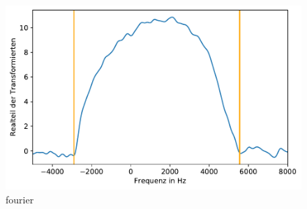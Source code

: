 \begin{figure}
    \center
    \includegraphics[scale = 1]{plots/fourier.pdf}
    \caption{fourier}
    \label{fig:fourier}
\end{figure}
